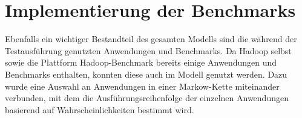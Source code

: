 \chapter{Implementierung der Benchmarks}\label{chap:benchmarks}

Ebenfalls ein wichtiger Bestandteil des gesamten Modells sind die während der Testausführung genutzten Anwendungen und Benchmarks. Da Hadoop selbst sowie die Plattform Hadoop-Benchmark bereits einige Anwendungen und Benchmarks enthalten, konnten diese auch im Modell genutzt werden. Dazu wurde eine Auswahl an Anwendungen in einer Markow-Kette miteinander verbunden, mit dem die Ausführungsreihenfolge der einzelnen Anwendungen basierend auf Wahrscheinlichkeiten bestimmt wird.





